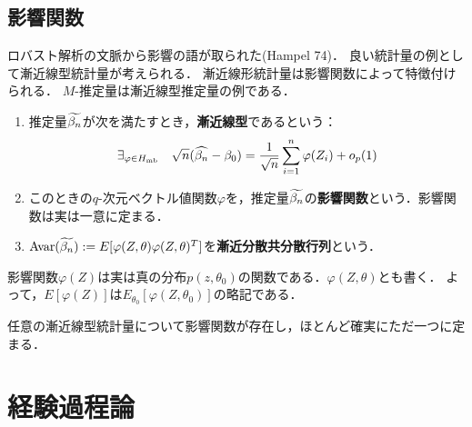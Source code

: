 \documentclass[uplatex,dvipdfmx]{jsreport}
\begin{document}
\section{影響関数}

\begin{tcolorbox}[colframe=ForestGreen, colback=ForestGreen!10!white,breakable,colbacktitle=ForestGreen!40!white,coltitle=black,fonttitle=\bfseries\sffamily,
title=]
    ロバスト解析の文脈から影響の語が取られた(Hampel 74)．
    良い統計量の例として漸近線型統計量が考えられる．
    漸近線形統計量は影響関数によって特徴付けられる．
    $M$-推定量は漸近線型推定量の例である．
\end{tcolorbox}

\begin{definition}\mbox{}
    \begin{enumerate}
        \item 推定量$\widetilde{\beta_n}$が次を満たすとき，\textbf{漸近線型}であるという：
        \[\exists_{\varphi\in H_{\mathrm{mb}}}\quad\sqrt{n}(\widehat{\beta_n}-\beta_0)=\frac{1}{\sqrt{n}}\sum^n_{i=1}\varphi(Z_i)+o_p(1)\]
        \item このときの$q$-次元ベクトル値関数$\varphi$を，推定量$\widetilde{\beta_n}$の\textbf{影響関数}という．影響関数は実は一意に定まる．
        \item $\mathrm{Avar}(\widetilde{\beta_n}):=E[\varphi(Z,\theta)\varphi(Z,\theta)^T]$を\textbf{漸近分散共分散行列}という．
    \end{enumerate}
\end{definition}
\begin{remark}
    影響関数$\varphi(Z)$は実は真の分布$p(z,\theta_0)$の関数である．$\varphi(Z,\theta)$とも書く．
    よって，$E[\varphi(Z)]$は$E_{\theta_0}[\varphi(Z,\theta_0)]$の略記である．
\end{remark}

\begin{theorem}
    任意の漸近線型統計量について影響関数が存在し，ほとんど確実にただ一つに定まる．
\end{theorem}

\chapter{経験過程論}
\end{document}

